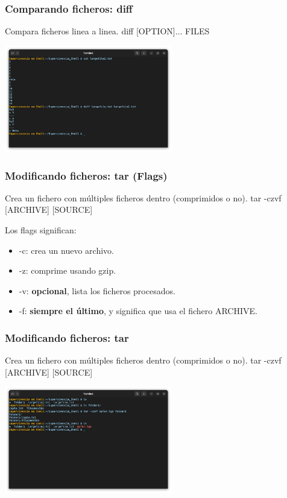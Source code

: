 \documentclass[10pt]{beamer}
\begin{document}
	\begin{frame}
		\frametitle{Comparando ficheros: diff}
		\begin{alertblock}{Compara ficheros linea a linea.}
			diff [OPTION]... FILES
		\end{alertblock}
		\begin{center}
			\includegraphics[width=0.55\textwidth]{diff}
		\end{center}
	\end{frame}
			
	\begin{frame}
		\frametitle{Modificando ficheros: tar (Flags)}
		\begin{alertblock}{Crea un fichero con múltiples ficheros dentro (comprimidos o no).}
			tar -czvf [ARCHIVE] [SOURCE]
		\end{alertblock}
		Los flags significan:
		\begin{itemize}
			\item -c: crea un nuevo archivo.
			\item -z: comprime usando gzip.
			\item -v: \textbf{opcional}, lista los ficheros procesados.
			\item -f: \textbf{siempre el último}, y significa que usa el fichero ARCHIVE.
		\end{itemize}
	\end{frame}
	
	\begin{frame}
		\frametitle{Modificando ficheros: tar}
		\begin{alertblock}{Crea un fichero con múltiples ficheros dentro (comprimidos o no).}
			tar -czvf [ARCHIVE] [SOURCE]
		\end{alertblock}
		\begin{center}
			\includegraphics[width=0.55\textwidth]{tar}
		\end{center}
	\end{frame}
	
\end{document}
